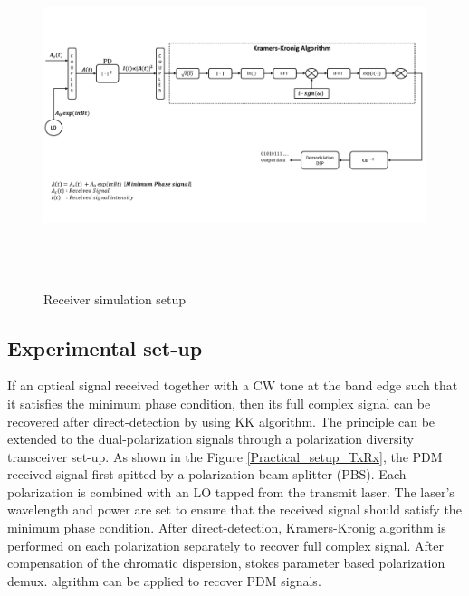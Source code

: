 \begin{figure}[h]
	\centering
	\includegraphics[width=1.0\textwidth, height=10cm]{./sdf/simplified_coherent_receiver/figures/Simulation_setup_Rx.pdf}
	\caption{Receiver simulation setup}\label{Simulation_setup_Rx}
\end{figure}







\subsection{Experimental set-up}
If an optical signal received together with a CW tone at the band edge such that it satisfies the minimum phase condition, then its full complex signal can be recovered after direct-detection by using KK algorithm. The principle can be extended to the dual-polarization signals through a polarization diversity transceiver set-up. As shown in the Figure \ref{Practical_setup_TxRx}, the PDM received signal first spitted by a polarization beam splitter (PBS). Each polarization is combined with an LO tapped from the transmit laser. The laser's wavelength and power are set to ensure that the received signal should satisfy the minimum phase condition. After direct-detection, Kramers-Kronig algorithm is performed on each polarization separately to recover full complex signal. After compensation of the chromatic dispersion, stokes parameter based polarization demux. algrithm can be applied to recover PDM signals.     

